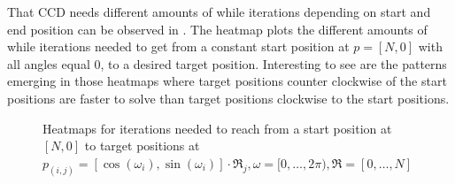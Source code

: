 That CCD needs different amounts of while iterations depending on start and end position can be observed in . The heatmap plots the different amounts of while iterations needed to get from a constant start position at $p = [N, 0]$ with all angles equal $0$, to a desired target position. Interesting to see are the patterns emerging in those heatmaps where target positions counter clockwise of the start positions are faster to solve than target positions clockwise to the start positions.
\begin{figure}
    \begin{center}
        \hfill
		\hfill
    \end{center}
    \caption[CCD iteration heatmap]{Heatmaps for iterations needed to reach from a start position at $[N, 0]$ to target positions at $p_{(i, j)} = [\cos(\omega_i), \sin(\omega_i)] \cdot \mathfrak{R}_j, \omega = [0, \ldots, 2\pi), \mathfrak{R}  = [0, \ldots, N]$}
    \label{fig:ccd_iterations}
\end{figure}

